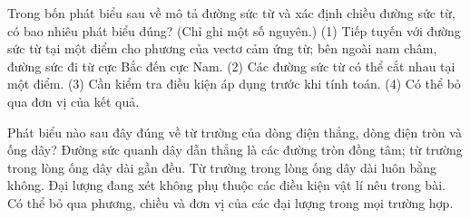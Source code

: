 \begin{ex}
Trong bốn phát biểu sau về mô tả đường sức từ và xác định chiều đường sức từ, có bao nhiêu phát biểu đúng? (Chỉ ghi một số nguyên.) (1) Tiếp tuyến với đường sức từ tại một điểm cho phương của vectơ cảm ứng từ; bên ngoài nam châm, đường sức đi từ cực Bắc đến cực Nam. (2) Các đường sức từ có thể cắt nhau tại một điểm. (3) Cần kiểm tra điều kiện áp dụng trước khi tính toán. (4) Có thể bỏ qua đơn vị của kết quả.
\end{ex}

\begin{ex}
Phát biểu nào sau đây đúng về từ trường của dòng điện thẳng, dòng điện tròn và ống dây?
\choice
{\True Đường sức quanh dây dẫn thẳng là các đường tròn đồng tâm; từ trường trong lòng ống dây dài gần đều.}
{Từ trường trong lòng ống dây dài luôn bằng không.}
{Đại lượng đang xét không phụ thuộc các điều kiện vật lí nêu trong bài.}
{Có thể bỏ qua phương, chiều và đơn vị của các đại lượng trong mọi trường hợp.}
\end{ex}

